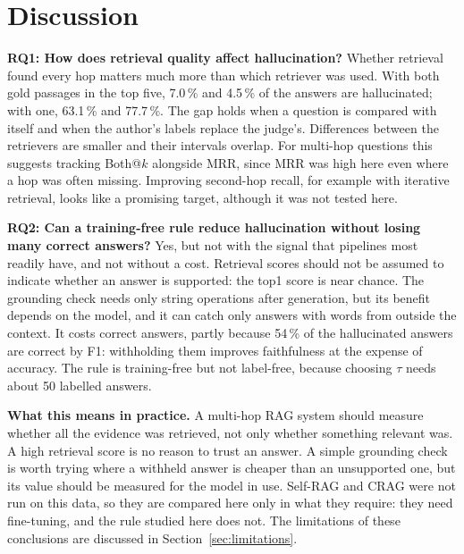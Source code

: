 \section{Discussion}\label{sec:res-discussion}

\textbf{RQ1: How does retrieval quality affect hallucination?}
Whether retrieval found every hop matters much more than which retriever was used. With both gold passages in the top
five, 7.0\,\% and 4.5\,\% of the answers are hallucinated; with one, 63.1\,\% and 77.7\,\%. The gap holds when a question is
compared with itself and when the author's labels replace the judge's. Differences between the retrievers are smaller and
their intervals overlap. For multi-hop questions this suggests tracking Both@$k$ alongside MRR, since MRR was high here even
where a hop was often missing. Improving second-hop recall, for example with iterative retrieval, looks like a promising
target, although it was not tested here.

\textbf{RQ2: Can a training-free rule reduce hallucination without losing many correct answers?}
Yes, but not with the signal that pipelines most readily have, and not without a cost. Retrieval scores should not be
assumed to indicate whether an answer is supported: the top1 score is near chance. The grounding check needs only string
operations after generation, but its benefit depends on the model, and it can catch only answers with words from outside
the context. It costs correct answers, partly because 54\,\% of the hallucinated answers are correct by F1: withholding them
improves faithfulness at the expense of accuracy. The rule is training-free but not label-free, because choosing $\tau$
needs about 50 labelled answers.

\textbf{What this means in practice.}
A multi-hop RAG system should measure whether all the evidence was retrieved, not only whether something relevant was. A
high retrieval score is no reason to trust an answer. A simple grounding check is worth trying where a withheld answer is
cheaper than an unsupported one, but its value should be measured for the model in use. Self-RAG and CRAG were not run on
this data, so they are compared here only in what they require: they need fine-tuning, and the rule studied here does not.
The limitations of these conclusions are discussed in Section~\ref{sec:limitations}.
